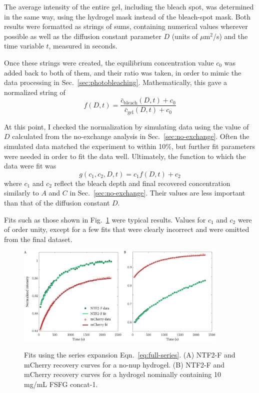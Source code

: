 The average intensity of the entire gel, including the bleach spot, was determined in the same way, using the hydrogel mask instead of the bleach-spot mask.  Both results were formatted as strings of sums, containing numerical values wherever possible as well as the diffusion constant parameter $D$ (units of $\mu$m$^2$/s)  and the time variable $t$, measured in seconds.

Once these strings were created, the equilibrium concentration value $c_0$ was added back to both of them, and their ratio was taken, in order to mimic the data processing in Sec.~\ref{sec:photobleaching}.  Mathematically, this gave a normalized string of
\begin{equation}
f(D,t) = \frac{\bar{c}_\mathrm{bleach}(D,t)+c_0}{\bar{c}_\mathrm{gel}(D,t)+c_0}
\end{equation}

At this point, I checked the normalization by simulating data using the value of $D$ calculated from the no-exchange analysis in Sec.~\ref{sec:no-exchange}.  Often the simulated data matched the experiment to within 10\%, but further fit parameters were needed in order to fit the data well.  Ultimately, the function to which the data were fit was
\begin{equation}
g(c_1,c_2,D,t) = c_1f(D,t) + c_2
\end{equation}
where $c_1$ and $c_2$ reflect the bleach depth and final recovered concentration similarly to $A$ and $C$ in Sec.~\ref{sec:no-exchange}.  Their values are less important than that of the diffusion constant $D$.

Fits such as those shown in Fig.~\ref{fig:series-fits} were typical results.  Values for $c_1$ and $c_2$ were of order unity, except for a few fits that were clearly incorrect and were omitted from the final dataset.

\begin{figure}
\caption{Fits using the series expansion Eqn.~\ref{eq:full-series}. (A) NTF2-F and mCherry recovery curves for a no-nup hydrogel.  (B) NTF2-F and mCherry recovery curves for a hydrogel nominally containing 10 mg/mL FSFG concat-1.}
\centering
\includegraphics[width=0.9\textwidth]{figs/ch04/series-fits.pdf}
\label{fig:series-fits}
\end{figure} 

